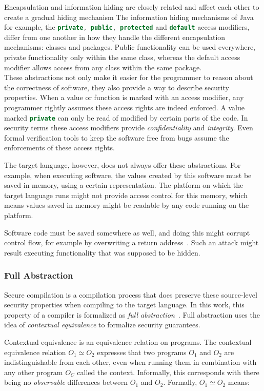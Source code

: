 Encapsulation and information hiding are closely related and affect each other to create a gradual hiding mechanism
The information hiding mechanisms of Java for example, the \lstinline[language=Java]{private, public, protected} and \lstinline[language=Java]{default} access modifiers, differ from one another in how they handle the different encapsulation mechanisms: classes and packages.
Public functionality can be used everywhere, private functionality only within the same class, whereas the default access modifier allows access from any class within the same package.
\\[1em]
These abstractions not only make it easier for the programmer to reason about the correctness of software, they also provide a way to describe security properties.
When a value or function is marked with an access modifier, any programmer rightly assumes these access rights are indeed enforced.
A value marked \lstinline[language=Java]{private} can only be read of modified by certain parts of the code.
In security terms these access modifiers provide \emph{confidentiality} and \emph{integrity}.
Even formal verification tools to keep the software free from bugs assume the enforcements of these access rights.

The target language, however, does not always offer these abstractions.
For example, when executing software, the values created by this software must be saved in memory, using a certain representation.
The platform on which the target language runs might not provide access control for this memory, which means values saved in memory might be readable by any code running on the platform.

Software code must be saved somewhere as well, and doing this might corrupt control flow, for example by overwriting a return address~\cite{OVSPaper}.
Such an attack might result executing functionality that was supposed to be hidden.

\subsubsection{Full Abstraction}
\label{sec:fullabstraction}
Secure compilation is a compilation process that does preserve these source-level security properties when compiling to the target language.
In this work, this property of a compiler is formalized as \emph{full abstraction}~\cite{Abadi}.
Full abstraction uses the idea of \emph{contextual equivalence} to formalize security guarantees.

Contextual equivalence is an equivalence relation on programs.
The contextual equivalence relation $O_{1} \simeq O_{2}$ expresses that two programs $O_1$ and $O_2$ are indistinguishable from each other, even when running them in combination with any other program $O_C$ called the context.
Informally, this corresponds with there being no \emph{observable} differences between $O_1$ and $O_2$.
Formally, $O_{1} \simeq O_{2}$ means:

